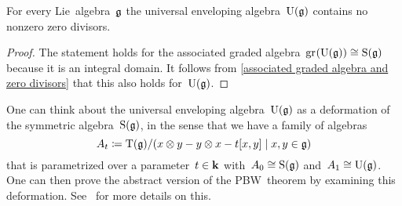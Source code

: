 \begin{corollary}
  For every Lie~algebra~$\mathfrak{g}$ the universal enveloping algebra~$\operatorname{U}(\mathfrak{g})$ contains no nonzero zero divisors.
\end{corollary}


\begin{proof}
  The statement holds for the associated graded algebra~$\gr(\Univ(\glie)) \cong \Symm(\glie)$ because it is an integral domain.
  It follows from \cref{associated graded algebra and zero divisors} that this also holds for~$\operatorname{U}(\mathfrak{g})$.
\end{proof}


\begin{remark}
  One can think about the universal enveloping algebra~$\operatorname{U}(\mathfrak{g})$ as a deformation of the symmetric algebra~$\operatorname{S}(\mathfrak{g})$, in the sense that we have a family of algebras
  \[
    A_t
    \defined
    \Tensor(\glie)/(x \tensor y - y \tensor x - t[x,y] \suchthat x, y \in \glie)
  \]
  that is parametrized over a parameter~$t \in \mathbf{k}$ with~$A_0 \cong \operatorname{S}(\mathfrak{g})$ and~$A_1 \cong \operatorname{U}(\mathfrak{g})$.
  One can then prove the abstract version of the PBW~theorem by examining this deformation.
  See~\cite{pbw_deformation} for more details on this.
\end{remark}




